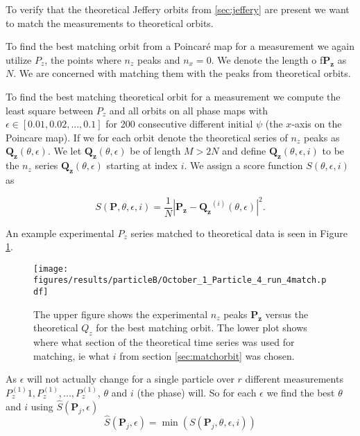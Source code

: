 \label{sec:matchorbit}
To verify that the theoretical Jeffery orbits from \ref{sec:jeffery} are present we want to match the measurements to theoretical orbits.

To find the best matching orbit from a Poincaré map for a measurement we again utilize $P_z$, the points where $n_z$ peaks and $n_x=0$. We denote the length o f$\mathbf{P_z}$ as $N$. We are concerned with matching them with the peaks from theoretical orbits.


To find the best matching theoretical orbit for a measurement we compute the least square between $P_z$ and all orbits on all phase maps with $\epsilon \in [0.01, 0.02, ..., 0.1]$ for 200 consecutive different initial $\psi$ (the $x$-axis on the Poincare map). If we for each orbit denote the theoretical series of $n_z$ peaks as $\mathbf{Q_z}(\theta, \epsilon)$. We let $\mathbf{Q_z}(\theta, \epsilon)$ be of length $M > 2N$ and define $\mathbf{Q_z}(\theta, \epsilon, i)$ to be the $n_z$ series $\mathbf{Q_z}(\theta, \epsilon)$ starting at index $i$. We assign a score function $S(\theta, \epsilon, i)$ as

\begin{equation}
S(\mathbf{P}, \theta, \epsilon, i) = \frac{1}{N}\left| \mathbf{P_z} - \mathbf{Q_z}^{(i)}(\theta, \epsilon) \right|^2.
\end{equation}

\noindent An example experimental $P_z$ series matched to theoretical data is seen in Figure \ref{fig:particleB2match}.

\begin{figure}[H]
\centering
\texttt{[image: figures/results/particleB/October\_1\_Particle\_4\_run\_4match.pdf]}
\caption{The upper figure shows the experimental $n_z$ peaks $\mathbf{P_z}$ versus the theoretical $Q_z$ for the best matching orbit. The lower plot shows where what section of the theoretical time series was used for matching, ie what $i$ from section \ref{sec:matchorbit} was chosen.}
\label{fig:particleB2match}
\end{figure}



\noindent As $\epsilon$ will not actually change for a single particle over $r$ different measurements $P_z^{(1)}1, P_z^{(1)}, ..., P_z^{(1)}$, $\theta$ and $i$ (the phase) will. So for each $\epsilon$ we find the best $\theta$ and $i$ using $\hat{S}(\mathbf{P}_j, \epsilon)$ 
\begin{equation}
\hat{S}(\mathbf{P}_j, \epsilon) =  \min(S(\mathbf{P}_j, \theta, \epsilon, i))
\end{equation}

